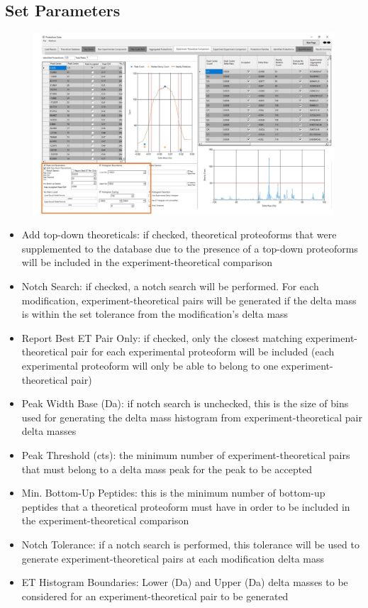 \subsection{Set Parameters}
\begin{figure}[h]
\centering
\includegraphics[scale=0.43]{figures/et1.jpg}
\end{figure}
\begin{itemize}
\item Add top-down theoreticals: if checked, theoretical proteoforms that were supplemented to the database due to the presence of a top-down proteoforms will be included in the experiment-theoretical comparison
\item Notch Search: if checked, a notch search will be performed. For each modification, experiment-theoretical pairs will be generated if the delta mass is within the set tolerance from the modification's delta mass
\item Report Best ET Pair Only: if checked, only the closest matching experiment-theoretical pair for each experimental proteoform will be included (each experimental proteoform will only be able to belong to one experiment-theoretical pair)
\item Peak Width Base (Da): if notch search is unchecked, this is the size of bins used for generating the delta mass histogram from experiment-theoretical pair delta masses
\item Peak Threshold (cts): the minimum number of experiment-theoretical pairs that must belong to a delta mass peak for the peak to be accepted
\item Min. Bottom-Up Peptides: this is the minimum number of bottom-up peptides that a theoretical proteoform must have in order to be included in the experiment-theoretical comparison
\item Notch Tolerance: if a notch search is performed, this tolerance will be used to generate experiment-theoretical pairs at each modification delta mass
\item ET Histogram Boundaries: Lower (Da) and Upper (Da) delta masses to be considered for an experiment-theoretical pair to be generated 
\end{itemize}


